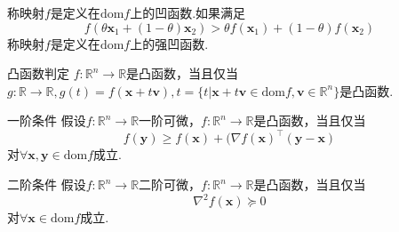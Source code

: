 称映射$f$是定义在$\mathrm{dom} f$上的凹函数.如果满足
\begin{equation}
f(\theta\boldsymbol{x}_1+(1-\theta)\boldsymbol{x}_2)>\theta f(\boldsymbol{x}_1) + (1-\theta)f(\boldsymbol{x}_2)~
\end{equation}
称映射$f$是定义在$\mathrm{dom} f$上的强凹函数.
\begin{theorem}{凸函数判定}
$f:\mathbb{R}^n\to\mathbb{R}$是凸函数，当且仅当$g:\mathbb{R}\to\mathbb{R},g(t)=f(\boldsymbol{x}+t\boldsymbol{v}),t=\{t|\boldsymbol{x}+t\boldsymbol{v}\in\mathrm{dom} f,\boldsymbol{v}\in\mathbb{R}^n\}$是凸函数.
\end{theorem}
\proof
\begin{theorem}{一阶条件}
假设$f:\mathbb{R}^n\to\mathbb{R}$一阶可微，$f:\mathbb{R}^n\to\mathbb{R}$是凸函数，当且仅当
\begin{equation}
f(\boldsymbol{y})\geqslant f(\boldsymbol{x})+(\nabla f(\boldsymbol{x})^\top(\boldsymbol{y}-\boldsymbol{x})~
\end{equation}
对$\forall\boldsymbol{x},\boldsymbol{y}\in\mathrm{dom} f$成立.
\end{theorem}
\begin{theorem}{二阶条件}
假设$f:\mathbb{R}^n\to\mathbb{R}$二阶可微，$f:\mathbb{R}^n\to\mathbb{R}$是凸函数，当且仅当
\begin{equation}
\nabla^2 f(\boldsymbol{x})\succeq 0~
\end{equation}
对$\forall\boldsymbol{x}\in\mathrm{dom} f$成立.
\end{theorem}